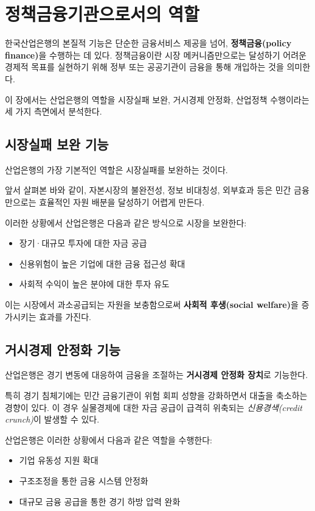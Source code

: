 \section{정책금융기관으로서의 역할}

한국산업은행의 본질적 기능은 단순한 금융서비스 제공을 넘어, \textbf{정책금융(policy finance)}을 수행하는 데 있다.  
정책금융이란 시장 메커니즘만으로는 달성하기 어려운 경제적 목표를 실현하기 위해 정부 또는 공공기관이 금융을 통해 개입하는 것을 의미한다.

이 장에서는 산업은행의 역할을 시장실패 보완, 거시경제 안정화, 산업정책 수행이라는 세 가지 측면에서 분석한다.

\subsection{시장실패 보완 기능}

산업은행의 가장 기본적인 역할은 시장실패를 보완하는 것이다.

앞서 살펴본 바와 같이, 자본시장의 불완전성, 정보 비대칭성, 외부효과 등은 민간 금융만으로는 효율적인 자원 배분을 달성하기 어렵게 만든다.

이러한 상황에서 산업은행은 다음과 같은 방식으로 시장을 보완한다:

\begin{itemize}
    \item 장기·대규모 투자에 대한 자금 공급
    \item 신용위험이 높은 기업에 대한 금융 접근성 확대
    \item 사회적 수익이 높은 분야에 대한 투자 유도
\end{itemize}

이는 시장에서 과소공급되는 자원을 보충함으로써 \textbf{사회적 후생(social welfare)}을 증가시키는 효과를 가진다.

\subsection{거시경제 안정화 기능}

산업은행은 경기 변동에 대응하여 금융을 조절하는 \textbf{거시경제 안정화 장치}로 기능한다.

특히 경기 침체기에는 민간 금융기관이 위험 회피 성향을 강화하면서 대출을 축소하는 경향이 있다. 이 경우 실물경제에 대한 자금 공급이 급격히 위축되는 \textit{신용경색(credit crunch)}이 발생할 수 있다.

산업은행은 이러한 상황에서 다음과 같은 역할을 수행한다:

\begin{itemize}
    \item 기업 유동성 지원 확대
    \item 구조조정을 통한 금융 시스템 안정화
    \item 대규모 금융 공급을 통한 경기 하방 압력 완화
\end{itemize}

